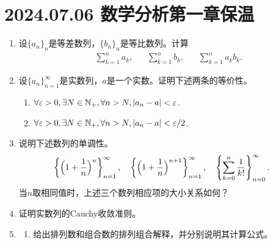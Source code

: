 \section*{2024.07.06 数学分析第一章保温}
\begin{enumerate}
    \item 设$\{a_n\}_{n}$是等差数列，$\{b_n\}_{n}$是等比数列。计算\begin{align*}
        &\sum_{k=1}^{n}a_k,&&\sum_{k=1}^{n}b_k,&&\sum_{k=1}^{n}a_kb_k.
    \end{align*}
    \item 设$\{a_n\}_{n=1}^\infty$是实数列，$a$是一个实数。证明下述两条的等价性。
    \begin{enumerate}
        \item $\forall \varepsilon>0, \exists N\in \mathbb{N_+}, \forall n>N, |a_n-a|<\varepsilon$.
        \item $\forall \varepsilon>0, \exists N\in \mathbb{N_+}, \forall n>N, |a_n-a|<\varepsilon/2$.
    \end{enumerate}
    \item 说明下述数列的单调性。
    \begin{align*}
        &\left\{\Bigl(1+\frac{1}{n}\Bigr)^n\right\}_{n=1}^\infty, && \left\{\Bigl(1+\frac{1}{n}\Bigr)^{n+1}\right\}_{n=1}^\infty, && \left\{\sum_{k=0}^{n}\frac{1}{k!}\right\}_{n=0}^\infty.
    \end{align*}
    当$n$取相同值时，上述三个数列相应项的大小关系如何？
    \item 证明实数列的Cauchy收敛准则。
    \item \begin{enumerate}
        \item 给出排列数和组合数的排列组合解释，并分别说明其计算公式。

\end{enumerate}
\end{enumerate}
